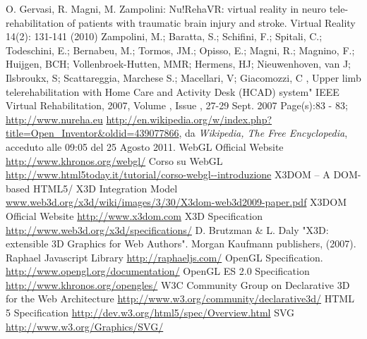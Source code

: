  O. Gervasi, R. Magni, M. Zampolini: Nu!RehaVR: virtual reality in neuro tele-rehabilitation of patients with traumatic brain injury and stroke. Virtual Reality 14(2): 131-141 (2010)
 Zampolini, M.; Baratta, S.; Schifini, F.; Spitali, C.; Todeschini, E.; Bernabeu, M.; Tormos, JM.; Opisso, E.; Magni, R.; Magnino, F.; Huijgen, BCH; Vollenbroek-Hutten, MMR; Hermens, HJ; Nieuwenhoven, van J; Ilsbroukx, S; Scattareggia, Marchese S.; Macellari, V; Giacomozzi, C ,
Upper limb telerehabilitation with Home Care and Activity Desk (HCAD) system" IEEE Virtual Rehabilitation, 2007, Volume , Issue , 27-29 Sept. 2007 Page(s):83 - 83; \url{http://www.nureha.eu}
 \url{http://en.wikipedia.org/w/index.php?title=Open_Inventor&oldid=439077866}, da \textit{Wikipedia, The Free Encyclopedia}, acceduto alle 09:05 del 25 Agosto 2011.
 WebGL Official Website \url{http://www.khronos.org/webgl/}
 Corso su WebGL \url{http://www.html5today.it/tutorial/corso-webgl--introduzione}
 X3DOM – A DOM-based HTML5/ X3D Integration Model \url{www.web3d.org/x3d/wiki/images/3/30/X3dom-web3d2009-paper.pdf}
 X3DOM Official Website \url{http://www.x3dom.com}
 X3D Specification \url{http://www.web3d.org/x3d/specifications/}
 D. Brutzman \& L. Daly "X3D: extensible 3D Graphics for Web Authors". Morgan Kaufmann publishers, (2007).
 Raphael Javascript Library \url{http://raphaeljs.com/}
 OpenGL Specification. \url{http://www.opengl.org/documentation/}
 OpenGL ES 2.0 Specification \url{http://www.khronos.org/opengles/}
 W3C Community Group on Declarative 3D for the Web Architecture \url{http://www.w3.org/community/declarative3d/}
 HTML 5 Specification \url{http://dev.w3.org/html5/spec/Overview.html}
 SVG \url{http://www.w3.org/Graphics/SVG/}
